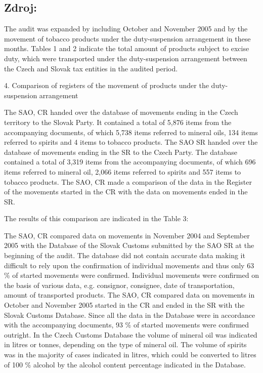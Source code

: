 \documentclass[10pt]{article}
\begin{document}
\subsection*{Zdroj:}

The audit was expanded by including October and November 2005 and by the movement of tobacco products under the duty-suspension arrangement in these months.
Tables 1 and 2 indicate the total amount of products subject to excise duty, which were transported under the duty-suspension arrangement between the Czech and Slovak tax entities in the audited period.


4. Comparison of registers of the movement of products under the duty-suspension arrangement

The SAO, CR handed over the database of movements ending in the Czech territory to the Slovak Party. It contained a total of 5,876 items from the accompanying documents, of which 5,738 items referred to mineral oils, 134 items referred to spirits and 4 items to tobacco products.
The SAO SR handed over the database of movements ending in the SR to the Czech Party. The database contained a total of 3,319 items from the accompanying documents, of which 696 items referred to mineral oil, 2,066 items referred to spirits and 557 items to tobacco products.
The SAO, CR made a comparison of the data in the Register of the movements started in the CR with the data on movements ended in the SR.


The results of this comparison are indicated in the Table 3:

The SAO, CR compared data on movements in November 2004 and September 2005 with the Database of the Slovak Customs submitted by the SAO SR at the beginning of the audit.
The database did not contain accurate data making it difficult to rely upon the confirmation of individual movements and thus only 63 \% of started movements were confirmed.
Individual movements were confirmed on the basis of various data, e.g. consignor, consignee, date of transportation, amount of transported products.
The SAO, CR compared data on movements in October and November 2005 started in the CR and ended in the SR with the Slovak Customs Database. Since all the data in the Database were in accordance with the accompanying documents, 93 \% of started movements were confirmed outright.
In the Czech Customs Database the volume of mineral oil was indicated in litres or tonnes, depending on the type of mineral oil.
The volume of spirits was in the majority of cases indicated in litres, which could be converted to litres of 100 \% alcohol by the alcohol content percentage indicated in the Database.
\end{document}
